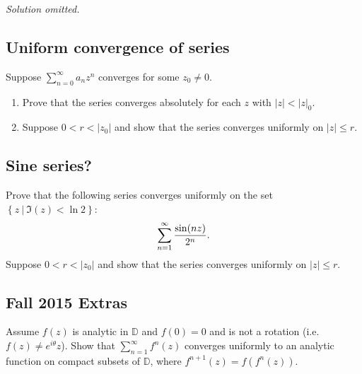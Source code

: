 \emph{Solution omitted.}

\hypertarget{uniform-convergence-of-series}{%
\subsection{Uniform convergence of
series}\label{uniform-convergence-of-series}}

\begin{problem}[?]

Suppose \(\sum_{n=0}^\infty a_n z^n\) converges for some \(z_0 \neq 0\).

\begin{enumerate}
\def\labelenumi{\alph{enumi}.}
\item
  Prove that the series converges absolutely for each \(z\) with
  \({\left\lvert {z} \right\rvert} < {\left\lvert {z} \right\rvert}_0\).
\item
  Suppose \(0 < r < {\left\lvert {z_0} \right\rvert}\) and show that the
  series converges uniformly on
  \({\left\lvert {z} \right\rvert} \leq r\).
\end{enumerate}

\end{problem}

\hypertarget{sine-series}{%
\subsection{Sine series?}\label{sine-series}}

\begin{problem}[?]

Prove that the following series converges uniformly on the set
\(\left\{{z {~\mathrel{\Big\vert}~}\Im(z) < \ln 2}\right\}\):
\begin{align*}
\sum_{n=1}^\infty {\sin(nz) \over 2^n}
.\end{align*}
Suppose \(0 < r < {\left\lvert {z_0} \right\rvert}\) and show that the
series converges uniformly on \({\left\lvert {z} \right\rvert} \leq r\).

\end{problem}

\hypertarget{fall-2015-extras}{%
\subsection{Fall 2015 Extras}\label{fall-2015-extras}}

Assume \(f(z)\) is analytic in \({\mathbb D}\) and \(f(0)=0\) and is not
a rotation (i.e.~\(f(z) \neq e^{i \theta} z\)). Show that
\(\displaystyle \sum_{n=1}^\infty f^{n}(z)\) converges uniformly to an
analytic function on compact subsets of \({\mathbb D}\), where
\(f^{n+1}(z) = f(f^{n}(z))\).

